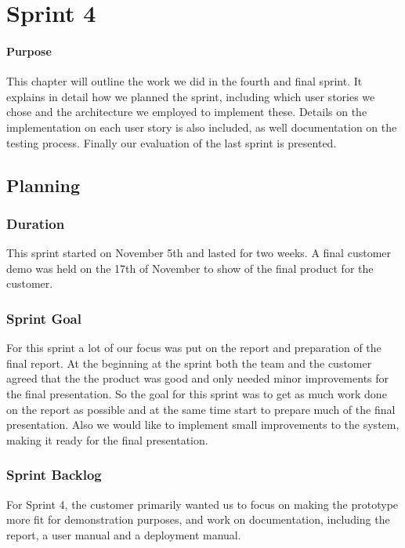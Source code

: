 \chapter{Sprint 4}

\minitoc

\subsubsection{Purpose}

This chapter will outline the work we did in the fourth and final sprint. It explains in detail how we planned the sprint, including which user stories we chose and the architecture we employed to implement these. Details on the implementation on each user story is also included, as well documentation on the testing process. Finally our evaluation of the last sprint is presented.

\clearpage


\section{Planning}

\subsection{Duration}
This sprint started on November 5th and lasted for two weeks. A final customer demo was held on the 17th of November to show of the final product for the customer.

\subsection{Sprint Goal}
For this sprint a lot of our focus was put on the report and preparation of the final report. At the beginning at the sprint both the team and the customer agreed that the the product was good and only needed minor improvements for the final presentation. So the goal for this sprint was to get as much work done on the report as possible and at the same time start to prepare much of the final presentation. Also we would like to implement small improvements to the system, making it ready for the final presentation.


\subsection{Sprint Backlog}
For Sprint 4, the customer primarily wanted us to focus on making the prototype more fit for demonstration purposes, and work on documentation, including the report, a user manual and a deployment manual. 

